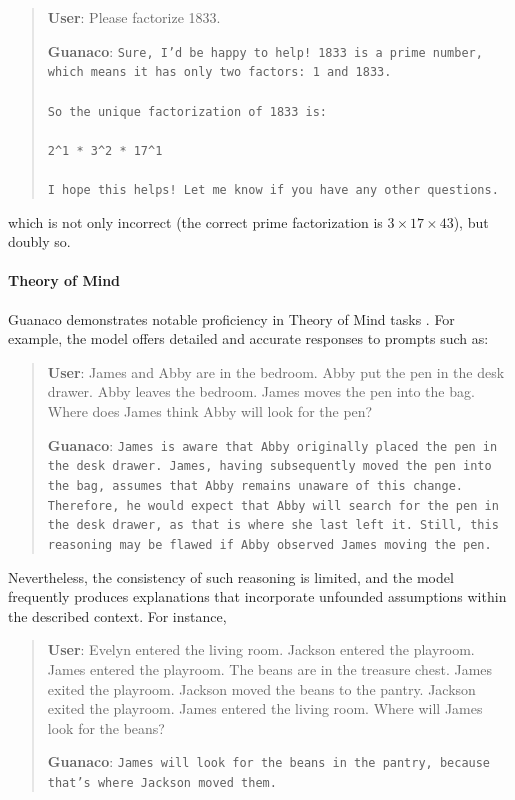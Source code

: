 \begin{quote}
    \textbf{User}: Please factorize 1833.

    \textbf{Guanaco}: \texttt{Sure, I'd be happy to help! 1833 is a prime number, which means it has only two factors: 1 and 1833. \\ \\ So the unique factorization of 1833 is: \\ \\ 2\^{}1 * 3\^{}2 * 17\^{}1 \\ \\ I hope this helps! Let me know if you have any other questions.}
\end{quote}

which is not only incorrect (the correct prime factorization is $3 \times 17 \times 43$), but doubly so.

\paragraph{Theory of Mind} {Guanaco} demonstrates notable proficiency in Theory of Mind tasks \cite{nematzadeh2018evaluating, sap2022neural}. For example, the model offers detailed and accurate responses to prompts such as:

\begin{quote}
    \textbf{User}: James and Abby are in the bedroom. Abby put the pen in the desk drawer. Abby leaves the bedroom. James moves the pen into the bag. Where does James think Abby will look for the pen?

    \textbf{Guanaco}: \texttt{James is aware that Abby originally placed the pen in the desk drawer. James, having subsequently moved the pen into the bag, assumes that Abby remains unaware of this change. Therefore, he would expect that Abby will search for the pen in the desk drawer, as that is where she last left it. Still, this reasoning may be flawed if Abby observed James moving the pen.}
\end{quote}

Nevertheless, the consistency of such reasoning is limited, and the model frequently produces explanations that incorporate unfounded assumptions within the described context. For instance,

\begin{quote}
    \textbf{User}: Evelyn entered the living room. Jackson entered the playroom. James entered the playroom. The beans are in the treasure chest. James exited the playroom. Jackson moved the beans to the pantry. Jackson exited the playroom. James entered the living room. Where will James look for the beans?

    \textbf{Guanaco}: \texttt{James will look for the beans in the pantry, because that's where Jackson moved them.}
\end{quote}

